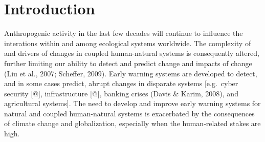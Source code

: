 \documentclass[12pt,twoside,openany]{reedthesis}
\begin{document}
\hypertarget{intro}{%
\chapter{Introduction}\label{intro}}

Anthropogenic activity in the last few decades will continue to influence the interations within and among ecological systems worldwide. The complexity of and drivers of changes in coupled human-natural systems is consequently altered, further limiting our ability to detect and predict change and impacts of change (Liu et al., 2007; Scheffer, 2009). Early warning systems are developed to detect, and in some cases predict, abrupt changes in disparate systems {[}e.g.~cyber security {[}@{]}, infrastructure {[}@{]}, banking crises (Davis \& Karim, 2008), and agricultural systems{]}. The need to develop and improve early warning systems for natural and coupled human-natural systems is exacerbated by the consequences of climate change and globalization, especially when the human-related stakes are high.
\end{document}
